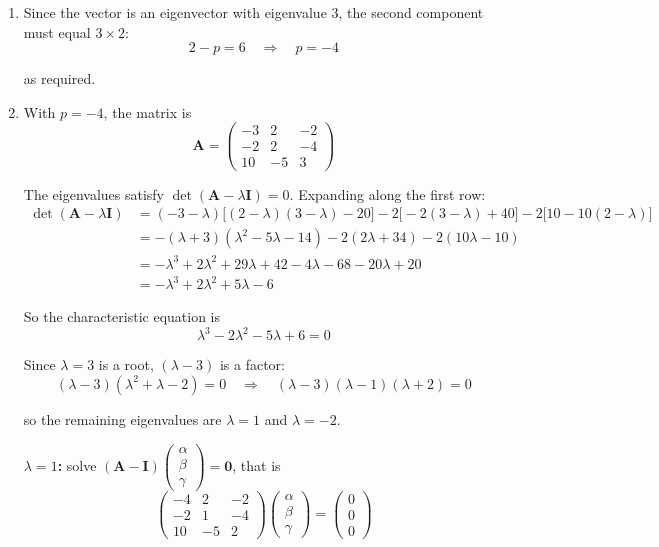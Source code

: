 \documentclass[leqno]{article}
\begin{document}
\begin{enumerate}[
  label=\textbf{\arabic*.},
  leftmargin=*,
  topsep=0pt,
  partopsep=0pt,
  parsep=0pt
]
\begin{djsSolution}
\begin{enumerate}[label=\textbf{(\alph*)}, start=1]
\begin{enumerate}[label=(\roman*), start=1]
The first and third components are \(3\times 1\) and \(3\times(-1)\), so the eigenvalue is \(3\).

    \item Since the vector is an eigenvector with eigenvalue \(3\), the second component must equal \(3\times 2\):
\[
2-p=6\quad\Longrightarrow\quad p=-4
\]

as required.

    \item With \(p=-4\), the matrix is
\[
\mathbf{A}=\begin{pmatrix}-3&2&-2\\ -2&2&-4\\ 10&-5&3\end{pmatrix}
\]

The eigenvalues satisfy \(\det(\mathbf{A}-\lambda\mathbf{I})=0\). Expanding along the first row:
\begin{align*}
\det(\mathbf{A}-\lambda\mathbf{I})&=(-3-\lambda)\big[(2-\lambda)(3-\lambda)-20\big]-2\big[-2(3-\lambda)+40\big]-2\big[10-10(2-\lambda)\big]\\
&=-(\lambda+3)(\lambda^2-5\lambda-14)-2(2\lambda+34)-2(10\lambda-10)\\
&=-\lambda^3+2\lambda^2+29\lambda+42-4\lambda-68-20\lambda+20\\
&=-\lambda^3+2\lambda^2+5\lambda-6
\end{align*}

So the characteristic equation is
\[
\lambda^3-2\lambda^2-5\lambda+6=0
\]

Since \(\lambda=3\) is a root, \((\lambda-3)\) is a factor:
\[
(\lambda-3)(\lambda^2+\lambda-2)=0\quad\Longrightarrow\quad(\lambda-3)(\lambda-1)(\lambda+2)=0
\]

so the remaining eigenvalues are \(\lambda=1\) and \(\lambda=-2\).

\textbf{\(\lambda=1\):} solve \((\mathbf{A}-\mathbf{I})\begin{pmatrix}\alpha\\ \beta\\ \gamma\end{pmatrix}=\mathbf{0}\), that is
\[
\begin{pmatrix}-4&2&-2\\ -2&1&-4\\ 10&-5&2\end{pmatrix}\begin{pmatrix}\alpha\\ \beta\\ \gamma\end{pmatrix}=\begin{pmatrix}0\\ 0\\ 0\end{pmatrix}
\]


\end{enumerate}
\end{enumerate}
\end{djsSolution}
\end{enumerate}
\end{document}
